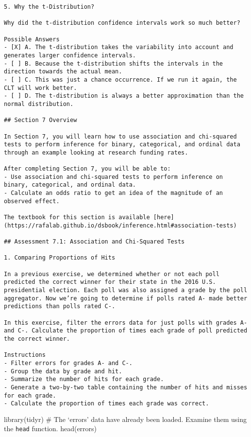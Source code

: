 \documentclass[
]{article}
\begin{document}
\begin{verbatim}
5. Why the t-Distribution?

Why did the t-distribution confidence intervals work so much better?

Possible Answers
- [X] A. The t-distribution takes the variability into account and generates larger confidence intervals. 
- [ ] B. Because the t-distribution shifts the intervals in the direction towards the actual mean. 
- [ ] C. This was just a chance occurrence. If we run it again, the CLT will work better. 
- [ ] D. The t-distribution is always a better approximation than the normal distribution.

## Section 7 Overview

In Section 7, you will learn how to use association and chi-squared tests to perform inference for binary, categorical, and ordinal data through an example looking at research funding rates.

After completing Section 7, you will be able to:
- Use association and chi-squared tests to perform inference on binary, categorical, and ordinal data.
- Calculate an odds ratio to get an idea of the magnitude of an observed effect.

The textbook for this section is available [here](https://rafalab.github.io/dsbook/inference.html#association-tests)

## Assessment 7.1: Association and Chi-Squared Tests

1. Comparing Proportions of Hits

In a previous exercise, we determined whether or not each poll predicted the correct winner for their state in the 2016 U.S. presidential election. Each poll was also assigned a grade by the poll aggregator. Now we’re going to determine if polls rated A- made better predictions than polls rated C-.

In this exercise, filter the errors data for just polls with grades A- and C-. Calculate the proportion of times each grade of poll predicted the correct winner.

Instructions
- Filter errors for grades A- and C-.
- Group the data by grade and hit.
- Summarize the number of hits for each grade.
- Generate a two-by-two table containing the number of hits and misses for each grade.
- Calculate the proportion of times each grade was correct.
\end{verbatim}

library(tidyr) \# The `errors' data have already been loaded. Examine
them using the \texttt{head} function. head(errors)
\end{document}
